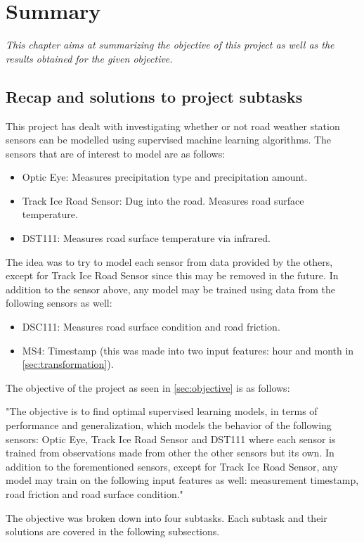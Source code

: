 \chapter{Summary}
\emph{This chapter aims at summarizing the objective of this project as well as the results obtained for the given objective.}

\section{Recap and solutions to project subtasks}
	This project has dealt with investigating whether or not road weather station sensors can be modelled using supervised machine learning algorithms. The sensors that are of interest to model are as follows:
	\begin{itemize}
		\item{Optic Eye:} Measures precipitation type and precipitation amount.
		\item{Track Ice Road Sensor:} Dug into the road. Measures road surface temperature.
		\item{DST111:} Measures road surface temperature via infrared.
	\end{itemize}
	
	The idea was to try to model each sensor from data provided by the others, except for Track Ice Road Sensor since this may be removed in the future. In addition to the sensor above, any model may be trained using data from the following sensors as well:
	\begin{itemize}
		\item{DSC111:} Measures road surface condition and road friction.
		\item{MS4:} Timestamp (this was made into two input features: hour and month in \ref{sec:transformation}).
	\end{itemize}

	The objective of the project as seen in \ref{sec:objective} is as follows:

	"The objective is to find optimal supervised learning models, in terms of performance and generalization, which models the behavior of the following sensors: Optic Eye, Track Ice Road Sensor and DST111 where each sensor is trained from observations made from other the other sensors but its own. In addition to the forementioned sensors, except for Track Ice Road Sensor, any model may train on the following input features as well: measurement timestamp, road friction and road surface condition."

	The objective was broken down into four subtasks. Each subtask and their solutions are covered in the following subsections.

